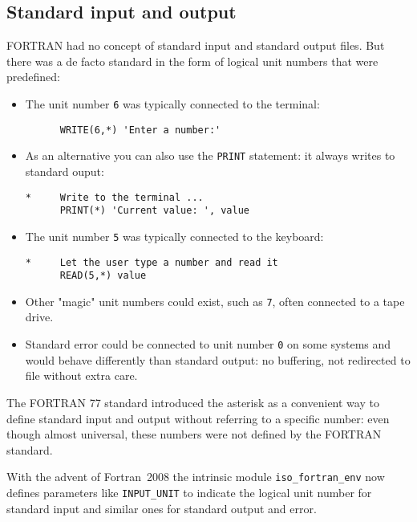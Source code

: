 \subsection{Standard input and output}
FORTRAN had no concept of standard input and standard output files. But there was a de facto
standard in the form of logical unit numbers that were predefined:
\begin{itemize}
\item
The unit number \verb+6+ was typically connected to the terminal:
\begin{verbatim}
      WRITE(6,*) 'Enter a number:'
\end{verbatim}
\item
As an alternative you can also use the \verb+PRINT+ statement: it always writes to
standard ouput:
\begin{verbatim}
*     Write to the terminal ...
      PRINT(*) 'Current value: ', value
\end{verbatim}

\item
The unit number \verb+5+ was typically connected to the keyboard:
\begin{verbatim}
*     Let the user type a number and read it
      READ(5,*) value
\end{verbatim}
\item
Other "magic" unit numbers could exist, such as \verb+7+, often connected to a tape drive.
\item
Standard error could be connected to unit number \verb+0+ on some systems and would behave
differently than standard output: no buffering, not redirected to file without extra care.
\end{itemize}

The FORTRAN 77 standard introduced the asterisk as a convenient way to define standard input
and output without referring to a specific number: even though almost universal, these numbers
were not defined by the FORTRAN standard.

With the advent of Fortran~2008 the intrinsic module \verb+iso_fortran_env+ now defines
parameters like \verb+INPUT_UNIT+ to indicate the logical unit number for standard input and
similar ones for standard output and error.


